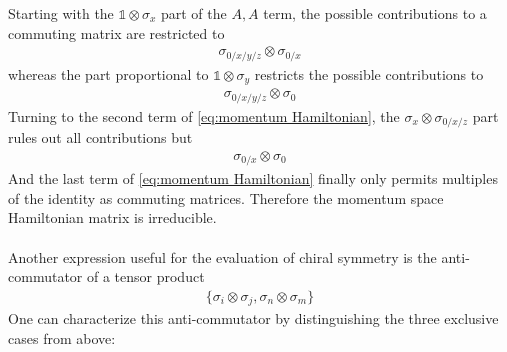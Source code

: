 Starting with the $\mathbb{1}\otimes\sigma_x$ part of the $A,A$ term, the possible contributions to a commuting matrix are restricted to
\begin{align*}
    \sigma_{0/x/y/z}\otimes\sigma_{0/x}
\end{align*}
whereas the part proportional to $\mathbb{1}\otimes\sigma_y$ restricts the possible contributions to 
\begin{align*}
    \sigma_{0/x/y/z}\otimes\sigma_{0}
\end{align*}
Turning to the second term of \eqref{eq:momentum Hamiltonian}, the $\sigma_x\otimes\sigma_{0/x/z}$ part rules out all contributions but
\begin{align*}
    \sigma_{0/x}\otimes\sigma_{0}
\end{align*}
And the last term of \eqref{eq:momentum Hamiltonian} finally only permits multiples of the identity as commuting matrices. Therefore the momentum space Hamiltonian matrix is irreducible.\\\\
Another expression useful for the evaluation of chiral symmetry is the anti-commutator of a tensor product
\begin{align*}
    \{\sigma_i\otimes\sigma_j,\sigma_n\otimes\sigma_m\}
\end{align*}
One can characterize this anti-commutator by distinguishing the three exclusive cases from above:
